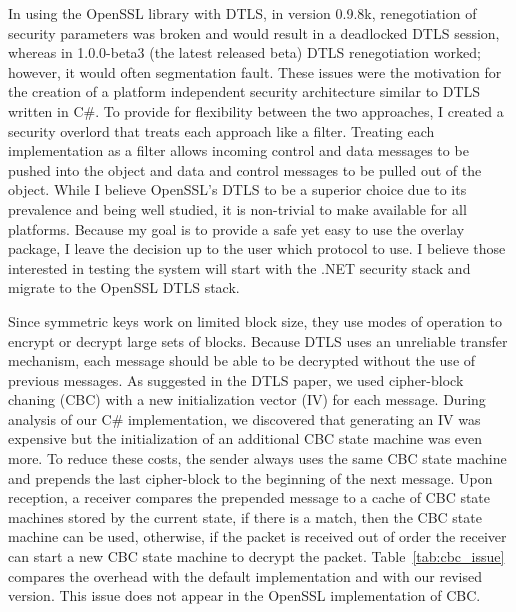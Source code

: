 In using the OpenSSL library with DTLS, in version 0.9.8k, renegotiation of
security parameters  was broken and would result in a deadlocked DTLS session,
whereas in 1.0.0-beta3 (the latest released beta) DTLS renegotiation worked;
however, it would often segmentation fault.  These issues were the motivation
for the creation of a platform independent security architecture similar to
DTLS written in C\#.  To provide for flexibility between the two approaches,
I created a security overlord that treats each approach like a filter.
Treating each implementation as a filter allows incoming control and data
messages to be pushed into the object and data and control messages to be
pulled out of the object.  While I believe OpenSSL's DTLS to be a superior
choice due to its prevalence and being well studied, it is non-trivial to make
available for all platforms.  Because my goal is to provide a safe yet easy to
use the overlay package, I leave the decision up to the user which protocol to
use.   I believe those interested in testing the system will start with the
.NET security stack and migrate to the OpenSSL DTLS stack.



Since symmetric keys work on limited block size, they use modes of operation
to encrypt or decrypt large sets of blocks.  Because DTLS uses an unreliable
transfer mechanism, each message should be able to be decrypted without the use
of previous messages.  As suggested in the DTLS paper, we used cipher-block
chaning (CBC) with a new initialization vector (IV) for each message.  During
analysis of our C\# implementation, we discovered that generating an IV was
expensive but the initialization of an additional CBC state machine was even
more.  To reduce these costs, the sender always uses the same CBC state machine
and prepends the last cipher-block to the beginning of the next message.  Upon
reception, a receiver compares the prepended message to a cache of CBC state
machines stored by the current state, if there is a match, then the CBC state
machine can be used, otherwise, if the packet is received out of order the
receiver can start a new CBC state machine to decrypt the packet.
Table~\ref{tab:cbc_issue} compares the overhead with the default implementation
and with our revised version.  This issue does not appear in the OpenSSL
implementation of CBC.

